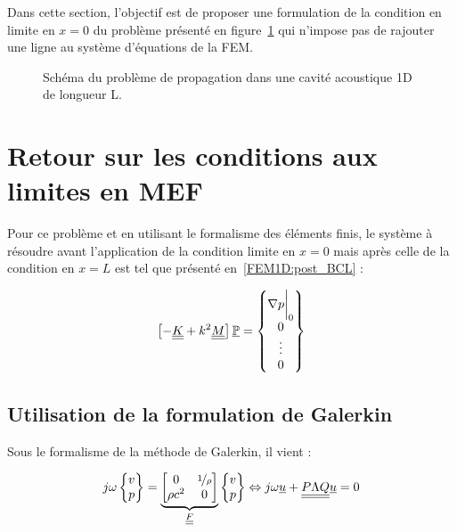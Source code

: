 Dans cette section, l'objectif est de proposer une formulation de la condition en limite en $x=0$ du problème présenté
en figure~\ref{fig:rflx:propa_1D} qui n'impose pas de rajouter une ligne au système d'équations de la FEM.

\begin{figure}[!ht]
	\centering
	
	\caption{\label{fig:rflx:propa_1D}Schéma du problème de propagation dans une cavité acoustique 1D de longueur L.}
\end{figure}

\section{Retour sur les conditions aux limites en MEF}

Pour ce problème et en utilisant le formalisme des éléments finis, le système à résoudre avant l'application de la
condition limite en $x=0$ mais après celle de la condition en $x=L$ est tel que présenté en~\eqref{FEM1D:post_BCL} :

\begin{equation}
\left[- \underline{\underline{K}} + k^2\underline{\underline{M}}\right]\underline{\mathbb{P}} = \begin{Bmatrix} \nabla p\bigg|_0\\0\\\vdots\\0\end{Bmatrix} \label{rflx:FEM}
\end{equation}


\subsection{Utilisation de la formulation de Galerkin}

Sous le formalisme de la méthode de Galerkin, il vient :

\begin{equation}
	j\omega\begin{Bmatrix}v\\p\end{Bmatrix} = 
		\underbrace{\begin{bmatrix}0 & \nicefrac{1}{\rho}\\\rho c^2 & 0\end{bmatrix}}_{\underline{\underline{F}}}
		\begin{Bmatrix}v\\p\end{Bmatrix} \Leftrightarrow j\omega\underline{u} + \underline{\underline{P\Lambda Q}}\underline{u} = 0
		\label{rflx:begin_dgm}
\end{equation}

